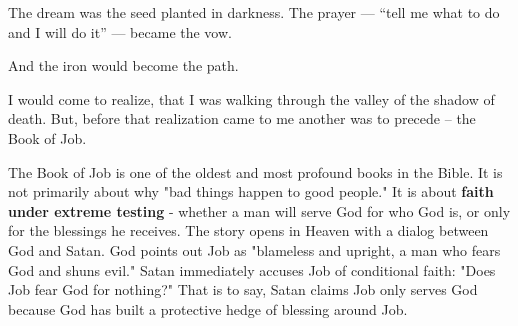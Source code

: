 \documentclass[12pt,a4paper]{book}
\begin{document}
The dream was the seed planted in darkness.
The prayer — “tell me what to do and I will do it” — became the vow.

And the iron would become the path.

I would come to realize, that I was walking through the valley of the shadow of death.  But, before that realization came to me another was to precede -- the Book of Job.

The Book of Job is one of the oldest and most profound books in the Bible.  It is not primarily about why "bad things happen to good people."  It is about \textbf{faith under extreme testing} - whether a man will serve God for who God is, or only for the blessings he receives.  The story opens in Heaven with a dialog between God and Satan.  God points out Job as "blameless and upright, a man who fears God and shuns evil."  Satan immediately accuses Job of conditional faith: "Does Job fear God for nothing?" That is to say, Satan claims Job only serves God because God has built a protective hedge of blessing around Job.
\end{document}
